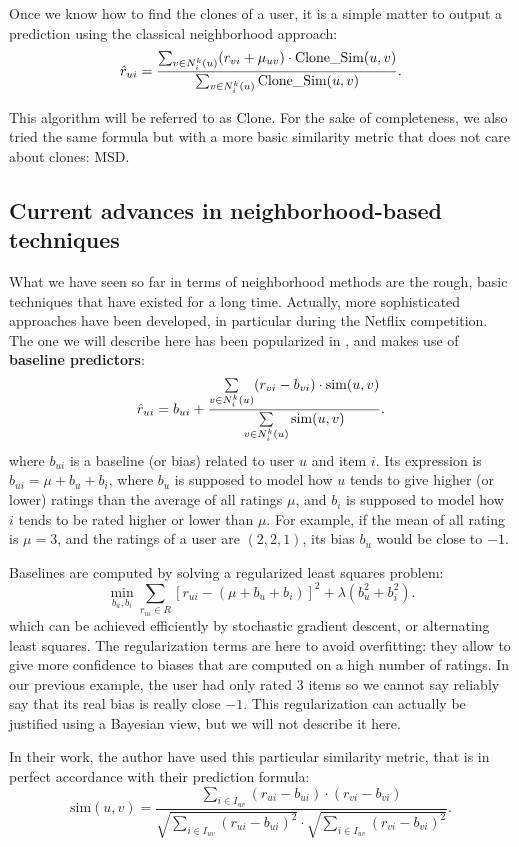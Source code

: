 \noindent
Once we know how to find the clones of a user, it is a simple matter to output
a prediction using the classical neighborhood approach:
$$\hat{r}_{ui} = \frac{\sum_{v \in N_i^k(u)} (r_{vi} + \mu_{uv}) \cdot \text{Clone\_Sim}(u,
v)}{\sum_{v \in N_i^k(u)} \text{Clone\_Sim}(u, v)}.$$

This algorithm will be referred to as Clone. For the sake of completeness, we
also tried the same formula but with a more basic similarity metric that does
not care about clones: MSD.

\subsection{Current advances in neighborhood-based techniques}

What we have seen so far in terms of neighborhood methods are the rough, basic
techniques that have existed for a long time. Actually, more sophisticated
approaches have been developed, in particular during the Netflix competition.
The one we will describe here has been popularized in \cite{BelKorSIGKDD2007},
and makes use of \textbf{baseline predictors}:
$$\hat{r}_{ui} = b_{ui} + \frac{\sum\limits_{v \in N_i^k(u)} (r_{vi} - b_{vi})
\cdot \text{sim}(u, v)} {\sum\limits_{v \in N_i^k(u)}\text{sim}(u, v)}.$$
where $b_{ui}$ is a baseline (or bias) related to user $u$ and item $i$. Its
expression is $b_{ui} = \mu + b_u + b_i$, where $b_u$ is supposed to model how
$u$ tends to give higher (or lower) ratings than the average of all ratings
$\mu$, and $b_i$ is supposed to model how $i$ tends to be rated higher or lower
than $\mu$. For example, if the mean of all rating is $\mu = 3$, and the
ratings of a user are $(2, 2, 1)$, its bias $b_u$ would be close to $-1$.

Baselines are computed by solving a regularized least squares problem:
$$\min_{b_u, b_i} \sum_{r_{ui} \in R} \left[r_{ui} - (\mu + b_u + b_i)\right]^2
+ \lambda \left(b_u^2 + b_i^2 \right).$$
which can be achieved efficiently by stochastic gradient descent, or
alternating least squares. The regularization terms are here to avoid
overfitting: they allow to give more confidence to biases that are computed on
a high number of ratings. In our previous example, the user had only rated $3$
items so we cannot say reliably say that its real bias is really close $-1$.
This regularization can actually be justified using a Bayesian view, but we
will not describe it here.

In their work, the author have used this particular similarity metric, that is
in perfect accordance with their prediction formula:
$$\text{sim}(u, v) = \frac
{ \sum\limits_{i \in I_{uv}} (r_{ui} -  b_{ui}) \cdot (r_{vi} - b_{vi})}
{\sqrt{\sum\limits_{i \in I_{uv}} (r_{ui} -  b_{ui})^2} \cdot
\sqrt{\sum\limits_{i \in I_{uv}} (r_{vi} -  b_{vi})^2}}.$$

